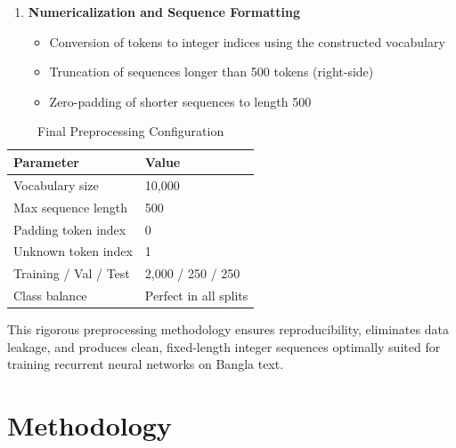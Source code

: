 \documentclass[pdflatex,sn-mathphys-num]{sn-jnl}
\theoremstyle{thmstyleone}\newtheorem{theorem}{Theorem}
\theoremstyle{thmstyletwo}\newtheorem{example}{Example}\newtheorem{remark}{Remark}
\theoremstyle{thmstylethree}\newtheorem{definition}{Definition}
\begin{document}
\begin{enumerate}
    \item \textbf{Numericalization and Sequence Formatting}
    \begin{itemize}
        \item Conversion of tokens to integer indices using the constructed vocabulary
        \item Truncation of sequences longer than 500 tokens (right-side)
        \item Zero-padding of shorter sequences to length 500
    \end{itemize}
\end{enumerate}

\begin{table}[!htbp]
    \centering
    \caption{Final Preprocessing Configuration}
    \label{tab:preprocess-config}
    \begin{tabular}{ll}
        \toprule
        Parameter                  & Value \\
        \midrule
        Vocabulary size            & 10,000 \\
        Max sequence length        & 500 \\
        Padding token index        & 0 \\
        Unknown token index        & 1 \\
        Training / Val / Test      & 2,000 / 250 / 250 \\
        Class balance              & Perfect in all splits \\
        \bottomrule
    \end{tabular}
\end{table}

This rigorous preprocessing methodology ensures reproducibility, eliminates data leakage, and produces clean, fixed-length integer sequences optimally suited for training recurrent neural networks on Bangla text.


\section{Methodology}


\end{document}
